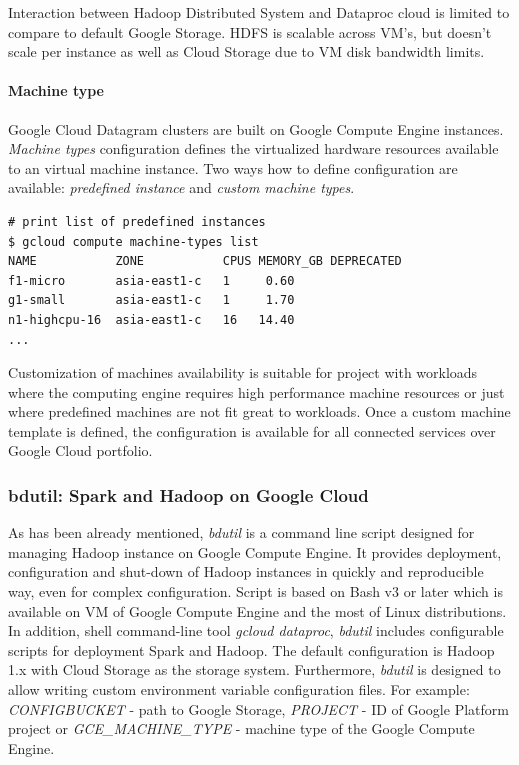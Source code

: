 \documentclass[a4paper,12pt,oneside]{report}
\begin{document}
	Interaction between Hadoop Distributed System and Dataproc cloud is limited to
	compare to default Google Storage. HDFS is scalable across VM’s, but doesn’t scale per instance as
	 well as Cloud Storage due to VM disk bandwidth limits. 
	
	\paragraph{Machine type} Google Cloud Datagram clusters are built on Google
	Compute Engine instances. \textit{Machine types} configuration defines the virtualized hardware
	 resources	available to an  virtual machine instance. Two ways how to define configuration are 
	 available: \textit{predefined instance} and \textit{custom machine types}.  
	
	\begin{footnotesize}
		\begin{lstlisting}[style=mybash]
# print list of predefined instances
$ gcloud compute machine-types list
NAME           ZONE           CPUS MEMORY_GB DEPRECATED
f1-micro       asia-east1-c   1     0.60
g1-small       asia-east1-c   1     1.70
n1-highcpu-16  asia-east1-c   16   14.40
...
		\end{lstlisting}
	\end{footnotesize}
	
	Customization of machines availability is suitable for project with workloads
	where the computing	engine requires high performance machine resources or just where predefined
	machines are not fit great to workloads. Once a custom machine template is 
	defined, the configuration is available for all connected services over Google
	Cloud portfolio.
	
	\subsubsection{bdutil: Spark and Hadoop on Google Cloud}\label{subsub:bdutil}
	As has been already mentioned, \textit{bdutil} is a command line script designed
	for	managing Hadoop instance on Google Compute Engine. It provides deployment,
	configuration	and shut-down of Hadoop instances in quickly and reproducible way, even for complex
	configuration. 	Script is based on Bash v3 or later which is available on VM of Google Compute
	Engine  and the most of Linux distributions. In addition, shell command-line tool
	\textit{gcloud dataproc}, \textit{bdutil} includes configurable scripts
	for deployment 	Spark and Hadoop. The default configuration is Hadoop 1.x with Cloud Storage as
	the storage system. Furthermore, \textit{bdutil} is designed to allow writing custom environment
	variable configuration 	files. For example: \emph{CONFIGBUCKET} - path to Google Storage, \emph{PROJECT}	
	- ID of Google Platform project or \emph{GCE\_MACHINE\_TYPE} - machine type of the Google Compute Engine.
	
\end{document}
